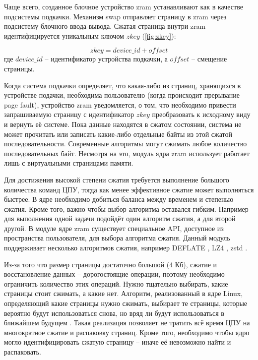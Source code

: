 Чаще всего, созданное блочное устройство zram устанавливают как в качестве подсистемы подкачки. Механизм swap отправляет страницу в zram через подсистему блочного ввода-вывода. Сжатая страница внутри zram идентифицируется уникальным ключом $zkey$ (\ref{fig:zkey}):

\begin{equation}\label{fig:zkey}
	zkey = device\_id + offset
\end{equation}
где $device\_id$ -- идентификатор устройства подкачки, а $offset$ -- смещение страницы.

Когда система подкачки определяет, что какая-либо из страниц, хранящихся в устройстве подачки, необходима пользователю (когда происходит прерывание page fault), устройство zram уведомляется, о том, что необходимо привести запрашиваемую страницу с идентификатор $zkey$ преобразовать к исходному виду и вернуть её системе. Пока данные находятся в сжатом состоянии, система не может прочитать или записать какие-либо отдельные байты из этой сжатой последовательности. Современные алгоритмы могут сжимать любое количество последовательных байт. Несмотря на это, модуль ядра zram использует работает лишь с виртуальными страницами памяти.

Для достижения высокой степени сжатия требуется выполнение большого количества команд ЦПУ, тогда как менее эффективное сжатие может выполняться быстрее. В ядре необходимо добиться баланса между временем и степенью сжатия. Кроме того, важно чтобы выбор алгоритма оставался гибким. Например для выполнения одной задачи подойдёт один алгоритм сжатия, а для второй другой. В модуле ядре zram существует специальное API, доступное из пространства пользователя, для выбора алгоритма сжатия. Данный модуль поддерживает несколько алгоритмов сжатия, например DEFLATE \cite{deflate}, LZ4 \cite{lz4}, zstd \cite{zstd}. 

Из-за того что размер страницы достаточно большой (4 Кб), сжатие и восстановление данных -- дорогостоящие операции, поэтому необходимо ограничить количество этих операций. Нужно тщательно выбирать, какие страницы стоит сжимать, а какие нет. Алгоритм, реализованный в ядре Linux, определяющий какие страницы нужно сжимать, выбирает те страницы, которые вероятно будут использоваться снова, но вряд ли будут использоваться в ближайшем будущем \cite{in-kernel-memory-compression}. Такая реализация позволяет не тратить всё время ЦПУ на многократное сжатие и распаковку страниц. Кроме того, необходимо чтобы ядро могло идентифицировать сжатую страницу -- иначе её невозможно найти и распаковать.

